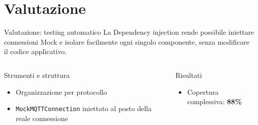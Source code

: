 \documentclass[aspectratio=169]{beamer}
\begin{document}
\section{Valutazione}
%
\begin{frame}{Valutazione: testing automatico}
    \centering
    La Dependency injection rende possibile iniettare connessioni Mock e isolare facilmente ogni singolo componente, senza modificare il codice applicativo.

    \vspace{2em}

    \begin{columns}
        \begin{block}{Strumenti e struttura}
            \begin{itemize}
                \item Organizzazione per protocollo
                \item \texttt{MockMQTTConnection} iniettato al posto della reale connessione
            \end{itemize}
        \end{block}

        \begin{block}{Risultati}
            \begin{itemize}
                \item Copertura complessiva: \textbf{88\%}
            \end{itemize}
        \end{block}
    \end{columns}
\end{frame}
%
\end{document}
